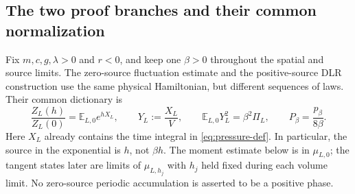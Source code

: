 \documentclass[11pt]{article}
\numberwithin{equation}{section}
\theoremstyle{definition}
\newcommand{\E}{\mathbb E}
\begin{document}
\subsection{The two proof branches and their common normalization}
\label{sec:composition-dictionary}

Fix $m,c,g,\lambda>0$ and $r<0$, and keep one $\beta>0$ throughout
the spatial and source limits.  The zero-source fluctuation estimate and
the positive-source DLR construction use the same physical Hamiltonian,
but different sequences of laws.  Their common dictionary is
\begin{equation}
 \frac{Z_L(h)}{Z_L(0)}=\E_{L,0}e^{hX_L},\qquad
 Y_L:=\frac{X_L}{V},\qquad
 \E_{L,0}Y_L^2=\beta^2\Pi_L,\qquad
 P_\beta=\frac{p_\beta}{8\beta}.
 \label{eq:composition-source-dictionary}
\end{equation}
Here $X_L$ already contains the time integral in \eqref{eq:pressure-def}.
In particular, the source in the exponential is $h$, not $\beta h$.
The moment estimate below is in $\mu_{L,0}$; the tangent states later are
limits of $\mu_{L,h_j}$ with $h_j$ held fixed during each volume limit.
No zero-source periodic accumulation is asserted to be a positive phase.
\end{document}
